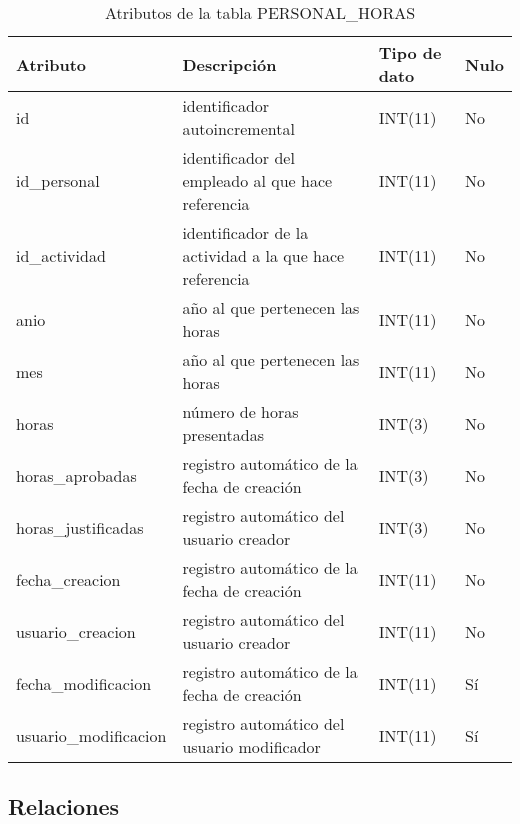 \begin{table}
\small
\centering
\begin{tabular}{|l|p{2in}|l|l|}\hline
\textbf{Atributo} & \textbf{Descripción} & \textbf{Tipo de dato} &
\textbf{Nulo} \\\hline\hline
id & identificador autoincremental & INT(11) & No\\\hline
id\_personal & identificador del empleado al que hace referencia & INT(11) &
No\\\hline
id\_actividad & identificador de la actividad a la que hace referencia & INT(11)
& No\\\hline
anio & año al que pertenecen las horas & INT(11) & No\\\hline
mes & año al que pertenecen las horas & INT(11) & No\\\hline
horas & número de horas presentadas & INT(3) & No\\\hline
horas\_aprobadas & registro automático de la fecha de creación & INT(3) &
No\\\hline
horas\_justificadas & registro automático del usuario creador & INT(3) &
No\\\hline
fecha\_creacion & registro automático de la fecha de creación & INT(11) &
No\\\hline
usuario\_creacion & registro automático del usuario creador & INT(11) &
No\\\hline
fecha\_modificacion & registro automático de la fecha de creación & INT(11) &
Sí\\\hline
usuario\_modificacion & registro automático del usuario modificador & INT(11) &
Sí\\\hline
\end{tabular}
\caption{Atributos de la tabla PERSONAL\_HORAS}
\label{tab:tabla_personal_horas}
\end{table}


\subsection{Relaciones}
\label{sec:relaciones}

